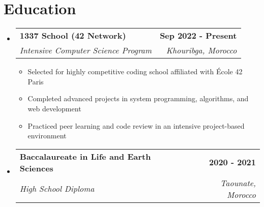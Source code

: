 \documentclass[11pt,a4paper]{article}
\makeatletter
\newcommand{\resumeItem}[1]{
  \item\small{
    {#1 \vspace{-2pt}}
  }
}
\newcommand{\resumeSubheading}[4]{
  \vspace{-2pt}\item
    \begin{tabular*}{0.97\textwidth}[t]{l@{\extracolsep{\fill}}r}
      \textbf{\color{linkcolor}#1} & \textbf{#2} \\
      \textit{\small#3} & \textit{\small #4} \\
    \end{tabular*}\vspace{-7pt}
}
\newcommand{\resumeSubHeadingListStart}{\begin{itemize}[leftmargin=0.15in, label={}]}
\newcommand{\resumeSubHeadingListEnd}{\end{itemize}}
\newcommand{\resumeItemListStart}{\begin{itemize}}
\newcommand{\resumeItemListEnd}{\end{itemize}\vspace{-5pt}}
\makeatother
\begin{document}
\section{Education}
\resumeSubHeadingListStart

\resumeSubheading
{1337 School (42 Network)}{Sep 2022 - Present}
{Intensive Computer Science Program}{Khouribga, Morocco}
\resumeItemListStart
\resumeItem{Selected for highly competitive coding school affiliated with École 42 Paris}
\resumeItem{Completed advanced projects in system programming, algorithms, and web development}
\resumeItem{Practiced peer learning and code review in an intensive project-based environment}
\resumeItemListEnd

\resumeSubheading
{Baccalaureate in Life and Earth Sciences}{2020 - 2021}
{High School Diploma}{Taounate, Morocco}

\resumeSubHeadingListEnd
\end{document}
